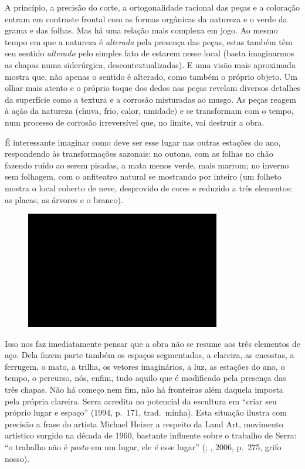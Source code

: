 A princípio, a precisão do corte, a ortogonalidade racional das peças e
a coloração entram em contraste frontal com as formas orgânicas da
natureza e o verde da grama e das folhas. Mas há uma relação mais
complexa em jogo. Ao mesmo tempo em que a natureza é \emph{alterada}
pela presença das peças, estas também têm seu sentido \emph{alterado}
pelo simples fato de estarem nesse local (basta imaginarmos as chapas
numa siderúrgica, descontextualizadas). E uma visão mais aproximada
mostra que, não apenas o sentido é alterado, como também o próprio
objeto. Um olhar mais atento e o próprio toque dos dedos nas peças
revelam diversos detalhes da superfície como a textura e a corrosão
misturadas ao musgo. As peças reagem à ação da natureza (chuva, frio,
calor, umidade) e se transformam com o tempo, num processo de corrosão
irreversível que, no limite, vai destruir a obra.

É interessante imaginar como deve ser esse lugar nas outras estações do
ano, respondendo às transformações sazonais: no outono, com as folhas no
chão fazendo ruído ao serem pisadas, a mata menos verde, mais marrom; no
inverno sem folhagem, com o anfiteatro natural se mostrando por inteiro
(um folheto mostra o local coberto de neve, desprovido de cores e
reduzido a três elementos: as placas, as árvores e o branco).

\begin{figure}[!ht]

\centering
 \includegraphics[width=85mm]{./imgs/im1.jpg}
\caption{\tiny{}}

\end{figure}

Isso nos faz imediatamente pensar que a obra não se resume aos três
elementos de aço. Dela fazem parte também os espaços segmentados, a
clareira, as encostas, a ferrugem, o mato, a trilha, os vetores
imaginários, a luz, as estações do ano, o tempo, o percurso, nós, enfim,
tudo aquilo que é modificado pela presença das três chapas. Não há
começo nem fim, não há fronteiras além daquela imposta pela própria
clareira. Serra acredita no potencial da escultura em ``criar seu
próprio lugar e espaço'' (1994, p.~171, trad.~minha). Esta situação
ilustra com precisão a frase do artista Michael Heizer a respeito da
Land Art, movimento artístico surgido na década de 1960, bastante
influente sobre o trabalho de Serra: ``o trabalho não é \emph{posto} em
um lugar, ele \emph{é} esse lugar'' (; , 2006, p.~275,
grifo nosso).

